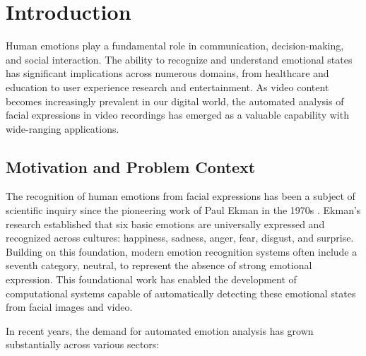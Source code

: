 \chapter{Introduction}
\label{chap:introduction}

Human emotions play a fundamental role in communication, decision-making, and social interaction. The ability to recognize and understand emotional states has significant implications across numerous domains, from healthcare and education to user experience research and entertainment. As video content becomes increasingly prevalent in our digital world, the automated analysis of facial expressions in video recordings has emerged as a valuable capability with wide-ranging applications.

\section{Motivation and Problem Context}
\label{sec:motivation}

The recognition of human emotions from facial expressions has been a subject of scientific inquiry since the pioneering work of Paul Ekman in the 1970s \cite{ekman1971constants}. Ekman's research established that six basic emotions are universally expressed and recognized across cultures: happiness, sadness, anger, fear, disgust, and surprise. Building on this foundation, modern emotion recognition systems often include a seventh category, neutral, to represent the absence of strong emotional expression. This foundational work has enabled the development of computational systems capable of automatically detecting these emotional states from facial images and video.

In recent years, the demand for automated emotion analysis has grown substantially across various sectors:

